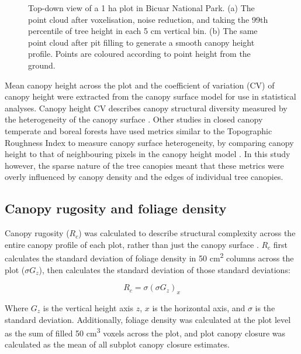 \begin{refsection}
\begin{figure}
\begin{subfigure}{0.45\linewidth}
		\caption{}
		\label{workflow:P1_pit}
	\end{subfigure}
	\caption[Canopy surface model before and after pit-filling]{Top-down view of a 1 ha plot in Bicuar National Park. (a) The point cloud after voxelisation, noise reduction, and taking the 99th percentile of tree height in each 5 cm vertical bin. (b) The same point cloud after pit filling to generate a smooth canopy height profile. Points are coloured according to point height from the ground.}
	\label{workflow:P1_both}
\end{figure}

Mean canopy height across the plot and the coefficient of variation (CV) of canopy height were extracted from the canopy surface model for use in statistical analyses. Canopy height CV describes canopy structural diversity measured by the heterogeneity of the canopy surface \citep{Parker2004}. Other studies in closed canopy temperate and boreal forests have used metrics similar to the Topographic Roughness Index to measure canopy surface heterogeneity, by comparing canopy height to that of neighbouring pixels in the canopy height model \citep{Weligepolage2012, HerreroHuerta2020}. In this study however, the sparse nature of the tree canopies meant that these metrics were overly influenced by canopy density and the edges of individual tree canopies. 

\subsection{Canopy rugosity and foliage density}

Canopy rugosity ($R_{c}$) was calculated to describe structural complexity across the entire canopy profile of each plot, rather than just the canopy surface \citep{Hardiman2011}. $R_{c}$ first calculates the standard deviation of foliage density in 50 cm\textsuperscript{2} columns across the plot ($\sigma{}G_{z}$), then calculates the standard deviation of those standard deviations: 

\begin{equation}
	R_{c} = \sigma{}(\sigma{}G_{z})_{x}
\end{equation}

Where $G_{z}$ is the vertical height axis $z$, $x$ is the horizontal axis, and $\sigma{}$ is the standard deviation. Additionally, foliage density was calculated at the plot level as the sum of filled 50 cm\textsuperscript{3} voxels across the plot, and plot canopy closure was calculated as the mean of all subplot canopy closure estimates. 


\end{refsection}
